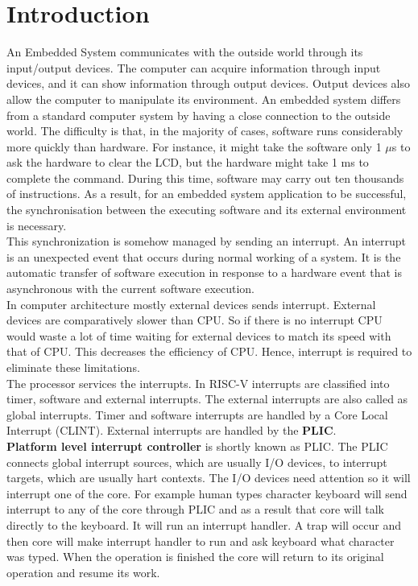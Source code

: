\chapter{Introduction}
\label{Chapter1}
An Embedded System communicates with the outside world through its input/output devices. The computer can acquire information through input devices, and it can show information through output devices. Output devices also allow the computer to manipulate its environment. An embedded system differs from a standard computer system by having a close connection to the outside world. The difficulty is that, in the majority of cases, software runs considerably more quickly than hardware. For instance, it might take the software only 1 ${\mu}$s to ask the hardware to clear the LCD, but the hardware might take 1 ms to complete the command. During this time, software may carry out ten thousands of instructions. As a result, for an embedded system application to be successful, the synchronisation between the executing software and its external environment is necessary. \\

This synchronization is somehow managed by sending an interrupt.  An interrupt is an unexpected event that occurs during normal working of a system. It is the automatic transfer of software execution in response to a hardware event that is asynchronous with the current software execution.\\

In computer architecture mostly external devices sends interrupt.  External devices are comparatively slower than CPU. So if there is no interrupt CPU would waste a lot of time waiting for external devices to match its speed with that of CPU. This decreases the efficiency of CPU. Hence, interrupt is required to eliminate these limitations.\\

The processor services the interrupts. In RISC-V interrupts are classified into timer, software and external interrupts. The external interrupts are also called as global interrupts. Timer and software interrupts are handled by a Core Local Interrupt (CLINT). External interrupts are handled by the \textbf{PLIC}.\\

\textbf{Platform level interrupt controller} is shortly known as PLIC. The PLIC connects global interrupt sources, which are usually I/O devices, to interrupt targets, which are usually hart contexts.
The I/O devices need attention so it will interrupt one of the core. For example human types character keyboard will send interrupt to any of the core through PLIC and as a result that core will talk directly to the keyboard. It will run an interrupt handler. A trap will occur and then core will make interrupt handler to run and ask keyboard what character was typed. When the operation is finished the core will return to its original operation and resume its work.\\

